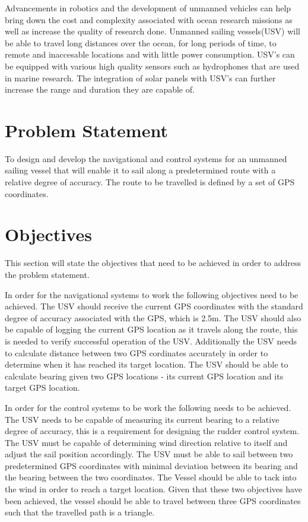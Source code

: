 Advancements in robotics and the development of unmanned vehicles can help bring down the cost and complexity associated with ocean research missions 
as well as increase the quality of research done. Unmanned sailing vessels(USV) will be able to travel long distances over the ocean, for long periods of 
time, to remote and inaccesable locations and with little power consumption. USV's can be equipped with various high quality sensors 
such as hydrophones that are used in marine research. The integration of solar panels with USV's can further increase the range and 
duration they are capable of.

\section{Problem Statement}
To design and develop the navigational and control systems for an unmanned sailing vessel that will enable it to sail along a predetermined route with a 
relative degree of accuracy. The route to be travelled is defined by a set of GPS coordinates. 

\section{Objectives}
This section will state the objectives that need to be achieved in order to address the problem statement.

In order for the navigational systems to work the following objectives need to be achieved. The USV should receive the current GPS coordinates with the 
standard degree of accuracy associated with the GPS, which is 2.5m. The USV 
should also be capable of logging the current GPS location as it travels along the route, this is needed to verify successful operation of the USV. 
Additionally the USV needs to calculate distance between two GPS cordinates accurately in order to determine when it has reached its target location. 
The USV should be able to calculate bearing given two GPS locations - its current GPS location and its target GPS location.


In order for the control systems to be work the following needs to be achieved.
The USV needs to be capable of measuring its current bearing to a relative degree of accuracy, this is a requirement for designing the rudder control system. 
The USV must be capable of determining wind direction relative to itself and adjust the sail position accordingly. 
The USV must be able to sail between two predetermined GPS coordinates with minimal deviation between its bearing and the bearing between the two coordinates.
The Vessel should be able to tack into the wind in order to reach a target location. Given that these two objectives have been achieved, the vessel should be
able to travel between three GPS coordinates such that the travelled path is a triangle.

